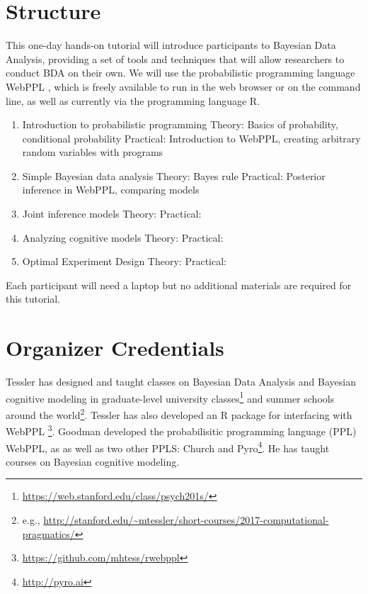 \documentclass[10pt,letterpaper]{article}
\begin{document}

\section{Structure}

This one-day hands-on tutorial will introduce participants to Bayesian Data Analysis, providing a set of tools and techniques that will allow researchers to conduct BDA on their own. 
We will use the probabilistic programming language WebPPL \cite{dippl}, which is freely available to run in the web browser or on the command line, as well as currently via the programming language R. 

\begin{enumerate}
\item Introduction to probabilistic programming
	\subitem Theory: Basics of probability, conditional probability
	\subitem Practical: Introduction to WebPPL, creating arbitrary random variables with programs
\item Simple Bayesian data analysis
	\subitem Theory: Bayes rule 
	\subitem Practical: Posterior inference in WebPPL, comparing models
\item Joint inference models
	\subitem Theory: 
	\subitem Practical:
\item Analyzing cognitive models
	\subitem Theory:
	\subitem Practical:
\item Optimal Experiment Design
	\subitem Theory:
	\subitem Practical:
\end{enumerate}

Each participant will need a laptop but no additional materials are required for this tutorial. 

\section{Organizer Credentials}

Tessler has designed and taught classes on Bayesian Data Analysis and Bayesian cognitive modeling in graduate-level university classes\footnote{
\url{https://web.stanford.edu/class/psych201s/}
} and summer schools around the world\footnote{
e.g., \url{http://stanford.edu/~mtessler/short-courses/2017-computational-pragmatics/}}. 
Tessler has also developed an R package for interfacing with WebPPL \footnote{\url{https://github.com/mhtess/rwebppl}}.
Goodman developed the probabilisitic programming language (PPL) WebPPL, as as well as two other PPLS: Church \cite{church} and Pyro\footnote{\url{http://pyro.ai}}.
He has taught courses on Bayesian cognitive modeling.



\setlength{\bibleftmargin}{.125in}
\setlength{\bibindent}{-\bibleftmargin}


\end{document}
